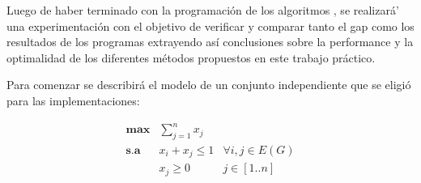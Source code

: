 \par{Luego de haber terminado con la programación de los algoritmos ,
se realizar\'a' una experimentación con el objetivo de verificar y comparar
tanto el gap como los resultados de los programas extrayendo
así conclusiones sobre la performance y la optimalidad de los diferentes
métodos propuestos en este trabajo práctico.}\\

\par{Para comenzar se describir\'a el modelo de un conjunto independiente que se eligi\'o para 
las implementaciones:

$$ \begin{array}{lll}
    \textbf{max} & \displaystyle \sum_{j=1}^{n} x_j \\
    \textbf{s.a} & \displaystyle x_i + x_j \leq 1 & \forall i,j \in E(G) \\
                 & \displaystyle x_j\geq 0 & j\in [1..n]
\end{array}$$ 








}

